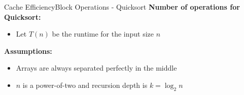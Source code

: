 

\begin{frame}{Cache Efficiency}{Block Operations - Quicksort}
  \textbf{Number of operations for Quicksort:}
  \begin{itemize}
    \item<2->Let {\color{MainA}$T(n)$} be the runtime for the
      {\color{MainA}input size $n$}
  \end{itemize}
  \vspace{1em}
  \textbf{Assumptions:}
  \begin{itemize}
    \item<4->
      Arrays are always separated perfectly in the middle
    \item<5->
      {\color{MainA}$n$} is a power-of-two and recursion depth is
      {\color{MainA}$k = \log_2 n$}
  \end{itemize}
\end{frame}


